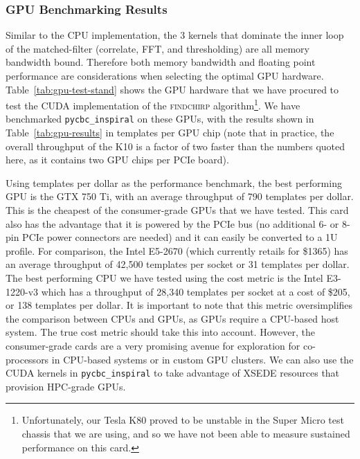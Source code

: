 \vspace*{-10pt}
\subsubsection{GPU Benchmarking Results}
\vspace*{-05pt}

Similar to the CPU implementation, the 3 kernels that dominate the inner loop
of the matched-filter (correlate, FFT, and thresholding) are all memory
bandwidth bound. Therefore both memory bandwidth and floating point performance
 are considerations when selecting the optimal GPU hardware.
Table~\ref{tab:gpu-test-stand} shows the GPU hardware that we have procured to
test the CUDA implementation of the \textsc{findchirp}
algorithm\footnote{Unfortunately, our Tesla K80 proved to be unstable in the
Super Micro test chassis that we are using, and so we have not been able to
measure sustained performance on this card.}. We have benchmarked
\texttt{pycbc\_inspiral} on these GPUs, with the results shown in 
Table~\ref{tab:gpu-results} in templates per GPU chip (note that in practice,
the overall throughput of the K10 is a factor of two faster than the numbers
quoted here, as it contains two GPU chips per PCIe board).

Using templates per dollar as the performance benchmark, the best performing
GPU is the GTX 750 Ti, with an average throughput of 790 templates per dollar.
This is the cheapest of the consumer-grade GPUs that we have tested. This card
also has the advantage that it is powered by the PCIe bus (no additional 6- or
8-pin PCIe power connectors are needed) and it can easily be converted to a 1U
profile.  For comparison, the Intel E5-2670 (which currently retails for
\$1365) has an average throughput of 42,500 templates per socket or 31
templates per dollar.  The best performing CPU we have tested using the cost
metric is the Intel E3-1220-v3 which has a throughput of 28,340 templates per
socket at a cost of \$205, or 138 templates per dollar. It is important to
note that this metric oversimplifies the comparison between CPUs and GPUs, as
GPUs require a CPU-based host system. The true cost metric should take this
into account. However, the consumer-grade cards are a very promising avenue
for exploration for co-processors in CPU-based systems or in custom GPU
clusters. We can also use the CUDA kernels in \texttt{pycbc\_inspiral} to take
advantage of XSEDE resources that provision HPC-grade GPUs.

